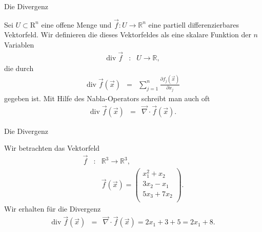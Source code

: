 \documentclass[german]{beamer}
\newcommand{\bq}{\begin{eqnarray*}}
\newcommand{\eq}{\end{eqnarray*}}
\newcommand{\superalert}[1]{{\color{MyYellowOrange}{#1}}}
\begin{document}
\begin{frame}{Die Divergenz}

\begin{definition}
Sei $U \subset {\mathrm R}^n$ eine offene Menge und 
$\vec{f} : U \rightarrow {\mathbb R}^n$ eine partiell differenzierbares Vektorfeld.
Wir definieren die \superalert{Divergenz} dieses Vektorfeldes als eine skalare Funktion der $n$ Variablen
\bq
 \mbox{div}\; \vec{f} & : & U \rightarrow {\mathbb R},
\eq
die durch
\bq
 \mbox{div}\; \vec{f}\left(\vec{x}\right) & = & 
  \sum\limits_{j=1}^n \frac{\partial f_j\left(\vec{x}\right)}{\partial x_j}
\eq
gegeben ist.
Mit Hilfe des Nabla-Operators schreibt man auch oft
\bq
 \mbox{div}\; \vec{f}\left(\vec{x}\right) & = & 
 \vec{\nabla} \cdot \vec{f}\left(\vec{x}\right).
\eq
\end{definition}

\end{frame}

\begin{frame}{Die Divergenz}

\begin{example}
Wir betrachten das Vektorfeld
\bq
 \vec{f} & : & {\mathbb R}^3 \rightarrow {\mathbb R}^3,
 \nonumber \\
 & & \vec{f}\left(\vec{x}\right)
 =
 \left( \begin{array}{c}
  x_1^2 + x_2 \\ 3 x_2 - x_1 \\ 5 x_3 + 7 x_2 \\
 \end{array} \right).
\eq
Wir erhalten f\"ur die Divergenz
\bq
 \mbox{div}\; \vec{f}\left(\vec{x}\right) & = & 
 \vec{\nabla} \cdot \vec{f}\left(\vec{x}\right)
 =
 2 x_1 + 3 + 5 = 2 x_1 + 8.
\eq
\end{example}

\end{frame}
\end{document}
